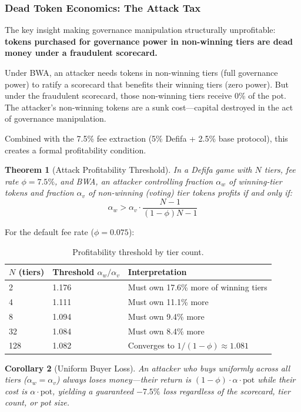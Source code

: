 \documentclass[11pt,a4paper]{article}
\newtheorem{theorem}{Theorem}
\newtheorem{corollary}[theorem]{Corollary}
\begin{document}
\subsubsection{Dead Token Economics: The Attack Tax}

The key insight making governance manipulation structurally unprofitable: \textbf{tokens purchased for governance power in non-winning tiers are dead money under a fraudulent scorecard.}

Under BWA, an attacker needs tokens in non-winning tiers (full governance power) to ratify a scorecard that benefits their winning tiers (zero power). But under the fraudulent scorecard, those non-winning tiers receive 0\% of the pot. The attacker's non-winning tokens are a sunk cost---capital destroyed in the act of governance manipulation.

Combined with the 7.5\% fee extraction (5\% Defifa + 2.5\% base protocol), this creates a formal profitability condition.

\begin{theorem}[Attack Profitability Threshold]\label{thm:profitability}
In a Defifa game with $N$ tiers, fee rate $\phi = 7.5\%$, and BWA, an attacker controlling fraction $\alpha_w$ of winning-tier tokens and fraction $\alpha_v$ of non-winning (voting) tier tokens profits if and only if:
\begin{equation}
\alpha_w > \alpha_v \cdot \frac{N-1}{(1-\phi)N - 1}
\end{equation}
\end{theorem}

For the default fee rate ($\phi = 0.075$):

\begin{table}[H]
\centering
\begin{tabular}{lll}
\toprule
$N$ (tiers) & Threshold $\alpha_w / \alpha_v$ & Interpretation \\
\midrule
2 & 1.176 & Must own 17.6\% more of winning tiers \\
4 & 1.111 & Must own 11.1\% more \\
8 & 1.094 & Must own 9.4\% more \\
32 & 1.084 & Must own 8.4\% more \\
128 & 1.082 & Converges to $1/(1-\phi) \approx 1.081$ \\
\bottomrule
\end{tabular}
\caption{Profitability threshold by tier count.}
\end{table}

\begin{corollary}[Uniform Buyer Loss]
An attacker who buys uniformly across all tiers ($\alpha_w = \alpha_v$) always loses money---their return is $(1-\phi) \cdot \alpha \cdot \text{pot}$ while their cost is $\alpha \cdot \text{pot}$, yielding a guaranteed $-7.5\%$ loss regardless of the scorecard, tier count, or pot size.
\end{corollary}
\end{document}
